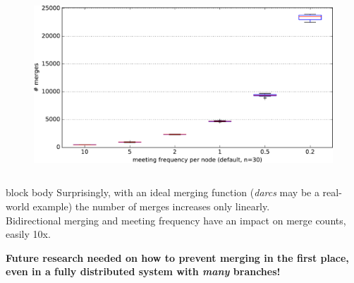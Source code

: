 \documentclass[final,hyperref={pdfpagelabels=false}]{beamer}
\begin{document}
\begin{frame}
\begin{columns}
\begin{column}{.9\textwidth}
\begin{columns}
\begin{column}{.3\textwidth}
\begin{figure}
      \includegraphics[width=\linewidth]{fig/dumb_meeting_frequency_n=30.pdf}
    \end{figure}
  \end{column}

  \end{columns}

  \vspace{10mm}
  \begin{center}
  
  \end{center}


  \vspace{1mm}
  \begin{beamercolorbox}[leftskip=0.5em,rightskip=0.5em,colsep*=.75ex,sep=0.5ex,vmode]{block body}%
  \vspace{0.2em}
  Surprisingly, with an ideal merging function (\textit{darcs} may be a real-world example) the number of merges increases only linearly. \\
  Bidirectional merging and meeting frequency have an impact on merge counts, easily 10x. \\
  \vspace{0.2em}
  \end{beamercolorbox}

  \vspace{1.5cm}
  \begin{center}
  \textbf{Future research needed on how to prevent merging in the first place, even in a fully distributed system with \textit{many} branches!}
  \end{center}

\end{column}
\end{columns}
\end{frame}
\end{document}
